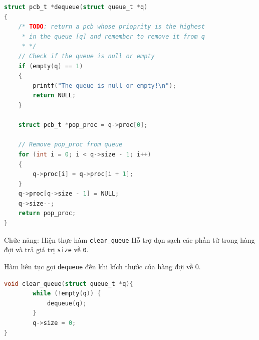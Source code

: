 \begin{lstlisting}[style=Cstyle,language=C]
struct pcb_t *dequeue(struct queue_t *q)
{
    /* TODO: return a pcb whose prioprity is the highest
     * in the queue [q] and remember to remove it from q
     * */
    // Check if the queue is null or empty
    if (empty(q) == 1)
    {
        printf("The queue is null or empty!\n");
        return NULL;
    }

    struct pcb_t *pop_proc = q->proc[0];

    // Remove pop_proc from queue
    for (int i = 0; i < q->size - 1; i++)
    {
        q->proc[i] = q->proc[i + 1];
    }
    q->proc[q->size - 1] = NULL;
    q->size--;
    return pop_proc;
}
\end{lstlisting}


\vspace{0.5 cm}

Chức năng: Hiện thực hàm \colorbox{gray!10}{\texttt{clear\_queue}} Hỗ trợ dọn sạch các phần tử trong hàng đợi và trả giá trị \texttt{size} về \texttt{0}.

 Hàm liên tục gọi \colorbox{gray!10}{\texttt{dequeue}} đến khi kích thước của hàng đợi về 0.
\begin{lstlisting}[style=Cstyle,language=C]
void clear_queue(struct queue_t *q){
        while (!empty(q)) {
            dequeue(q);
        }
        q->size = 0;
}
\end{lstlisting}




